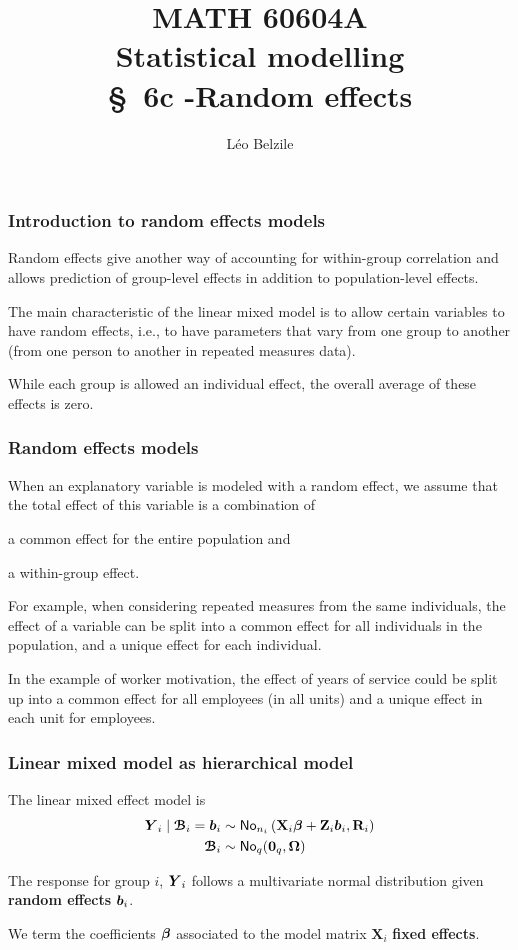 \documentclass{beamer}
\title[\color{white}{MATH 60604A \S~6c - Random effects}]{\texorpdfstring{MATH 60604A \\Statistical modelling \\ \S~6c -Random effects}{MATH 60604A \\Statistical modelling \\ \S~6c - Random effects}}
\author{Léo Belzile}
\institute{HEC Montréal\\
Department of Decision Sciences}
\date{}
\begin{document}
\frame{\titlepage}



\begin{frame}
\frametitle{Introduction to random effects models}
 Random effects give another way of accounting for within-group correlation and allows prediction of group-level effects in addition to population-level effects.
 \bi \item The main characteristic of the \alert{linear mixed model} is to allow certain variables to have \alert{random effects}, i.e., \alert{to have parameters that vary from one group to another} (from one person to another in repeated measures data). 
\item While each group is allowed an individual effect, the overall average of these effects is zero.
\ei
\end{frame}

\begin{frame}[fragile]
\frametitle{Random effects models}
\bi
\item When an explanatory variable is modeled with a random effect, we assume that \alert{the total effect of this variable is a combination of}
\be

\item a \alert{common effect} for the entire population and  
\item a \alert{within-group effect}. 
\ee
\item For example, when considering repeated measures from the same individuals, the effect of a variable can be split into a common effect for all individuals in the population, and a unique effect for each individual. 
\item In the example of worker motivation, the effect of years of service could be split up into a common effect for all employees (in all units) and a unique effect in each unit for employees.
\ei
\end{frame}
\begin{frame}
 \frametitle{Linear mixed model as hierarchical model}
The linear mixed effect model is 
 \begin{align*}
  \boldsymbol {Y}_i \mid \boldsymbol {\mathcal{B}}_i =\boldsymbol {b}_i &\sim \mathsf{No}_{n_i}\left( \mathbf{X}_i \boldsymbol {\beta} + \mathbf{Z}_i\boldsymbol {b}_i, \mathbf{R}_i\right) \\
  \boldsymbol {\mathcal{B}}_i & \sim \mathsf{No}_{q}( \boldsymbol {0}_q, \boldsymbol {\Omega})
 \end{align*}

 \bi \item 
 The response for group $i$, $\boldsymbol {Y}_i$ follows a multivariate normal distribution given \textbf{random effects} $\boldsymbol {b}_i$.
 \item 
 We term the coefficients $\boldsymbol {\beta}$ associated to the model matrix $\mathbf{X}_i$ \textbf{fixed effects}.
 \ei 
\end{frame}
\end{document}

